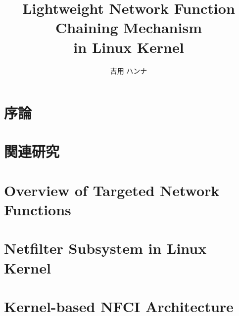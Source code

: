 \documentclass[12pt]{b-thesis}
\begin{document}
\title{Lightweight Network Function Chaining Mechanism \\ in Linux Kernel}
\author{吉用 ハンナ}
\maketitle

 
\makejabstract 

\clearpage


\setcounter{page}{1}

\tableofcontents
\thispagestyle{plain}

\listoffigures   %
\listoftables    %

\clearpage

\pagestyle{headings}
\setcounter{page}{1}

\clearpage

\chapter{序論}
\label{chap:intro}


\chapter{関連研究}
\label{chap:related}


\chapter{Overview of Targeted Network Functions}
\label{chap:overview}


\chapter{Netfilter Subsystem in Linux Kernel}
\label{chap:linux}


\chapter{Kernel-based NFCI Architecture}
\label{chap:architecture}

\end{document}
